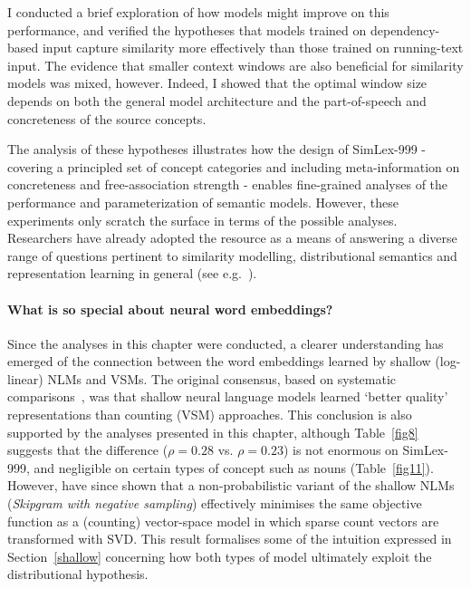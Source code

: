 I conducted a brief exploration of how models might improve on this performance, and verified the hypotheses that models trained on dependency-based input capture similarity more effectively than those trained on running-text input. The evidence that smaller context windows are also beneficial for similarity models was mixed, however. Indeed, I showed that the optimal window size depends on both the general model architecture and the part-of-speech and concreteness of the source concepts. 

The analysis of these hypotheses illustrates how the design of SimLex-999 - covering a principled set of concept categories and including meta-information on concreteness and free-association strength - enables fine-grained analyses of the performance and parameterization of semantic models. However, these experiments only scratch the surface in terms of the possible analyses. Researchers have already adopted the resource as a means of answering a diverse range of questions pertinent to similarity modelling, distributional semantics and representation learning in general (see e.g.~\citep{levy2015improving,wang2015learning}).

\paragraph{What is so special about neural word embeddings?}

Since the analyses in this chapter were conducted, a clearer understanding has emerged of the connection between the word embeddings learned by shallow (log-linear) NLMs and VSMs. The original consensus, based on systematic comparisons~\citep{baroni2014don}, was that shallow neural language models learned `better quality' representations than counting (VSM) approaches. This conclusion is also supported by the analyses presented in this chapter, although Table~\ref{fig8} suggests that the difference (\(\rho = 0.28\) vs. \(\rho = 0.23\)) is not enormous on SimLex-999, and negligible on certain types of concept such as nouns (Table~\ref{fig11}). However, \cite{levy2014neural} have since shown that a non-probabilistic variant of the shallow NLMs (\emph{Skipgram with negative sampling}) effectively minimises the same objective function as a (counting) vector-space model in which sparse count vectors are transformed with SVD. This result formalises some of the intuition expressed in Section~\ref{shallow} concerning how both types of model ultimately exploit the distributional hypothesis. 

